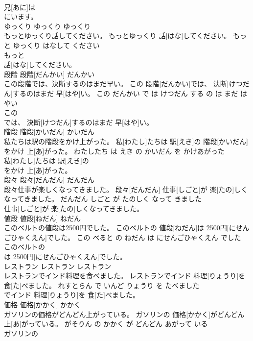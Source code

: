 \documentclass[8pt]{extreport}
\begin{document}
\begin{CJK}{UTF8}{min}
\\	兄[あに]は
\\	にいます。			
\\	ゆっくり	ゆっくり	ゆっくり	
\\	もっとゆっくり話してください。	もっとゆっくり 話[はな]してください。	もっと ゆっくり はなして ください	
\\	もっと
\\	話[はな]してください。			
\\	段階	段階[だんかい]	だんかい	
\\	この段階では、決断するのはまだ早い。	この 段階[だんかい]では、 決断[けつだん]するのはまだ 早[はや]い。	この だんかい で は けつだん する の は まだ はやい	
\\	この
\\	では、 決断[けつだん]するのはまだ 早[はや]い。			
\\	階段	階段[かいだん]	かいだん	
\\	私たちは駅の階段をかけ上がった。	私[わたし]たちは 駅[えき]の 階段[かいだん]をかけ 上[あ]がった。	わたしたち は えき の かいだん を かけあがった	
\\	私[わたし]たちは 駅[えき]の
\\	をかけ 上[あ]がった。			
\\	段々	段々[だんだん]	だんだん	
\\	段々仕事が楽しくなってきました。	段々[だんだん] 仕事[しごと]が 楽[たの]しくなってきました。	だんだん しごと が たのしく なって きました	
\\	仕事[しごと]が 楽[たの]しくなってきました。			
\\	値段	値段[ねだん]	ねだん	
\\	このベルトの値段は2500円でした。	このベルトの 値段[ねだん]は 2500円[にせんごひゃくえん]でした。	この べると の ねだん は にせんごひゃくえん でした	
\\	このベルトの
\\	は 2500円[にせんごひゃくえん]でした。			
\\	レストラン	レストラン	レストラン	
\\	レストランでインド料理を食べました。	レストランでインド 料理[りょうり]を 食[た]べました。	れすとらん で いんど りょうり を たべました	
\\	でインド 料理[りょうり]を 食[た]べました。			
\\	価格	価格[かかく]	かかく	
\\	ガソリンの価格がどんどん上がっている。	ガソリンの 価格[かかく]がどんどん 上[あ]がっている。	がそりん の かかく が どんどん あがって いる	
\\	ガソリンの

\end{CJK}
\end{document}
